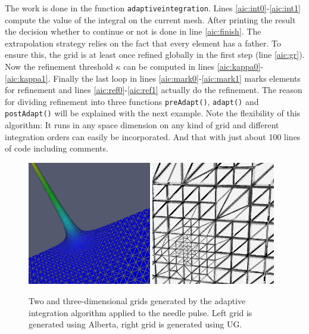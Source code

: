 \documentclass[11pt,a4paper,headinclude,footinclude,DIV16,headings=normal]{scrreprt}
\begin{document}
The work is done in the function \lstinline!adaptiveintegration!.
Lines \ref{aic:int0}-\ref{aic:int1} compute the value of the integral
on the current mesh. After printing the result the decision whether
to continue or not is done in line \ref{aic:finish}. The extrapolation
strategy relies on the fact that every element has a father. To ensure
this, the grid is at least once refined globally in the first step
(line \ref{aic:gr}). Now the refinement threshold $\kappa$ can be
computed in lines \ref{aic:kappa0}-\ref{aic:kappa1}. Finally the last
loop in lines \ref{aic:mark0}-\ref{aic:mark1} marks elements for
refinement and lines \ref{aic:ref0}-\ref{aic:ref1} actually do the
refinement. The reason for dividing refinement into three functions
\lstinline!preAdapt()!, \lstinline!adapt()! and
\lstinline!postAdapt()! will be explained with the next example. Note
the flexibility of this algorithm: It runs in any space dimension on
any kind of grid and different integration orders can easily be
incorporated. And that with just about 100 lines of code including
comments.

\begin{figure}
\includegraphics[width=0.48\textwidth]{EPS/adaptiveintegration_alberta2d}\hfill
\includegraphics[width=0.48\textwidth]{EPS/adaptiveintegration_ug3d}
\caption{Two and three-dimensional grids generated by the adaptive
  integration algorithm applied to the needle pulse. Left grid is
  generated using Alberta, right grid is generated using UG.}
\label{Fig:AdaptiveIntegration}
\end{figure}
\end{document}
